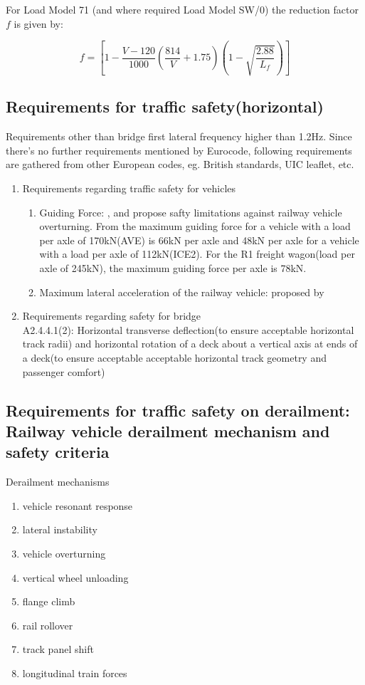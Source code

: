 For Load Model 71 (and where required Load Model SW/0) the reduction factor $f$ is given by:

\begin{equation}
	f=[1-\frac{V-120}{1000}(\frac{814}{V}+1.75)(1-\sqrt{\frac{2.88}{L_f}})]
\end{equation}

\subsection{Requirements for traffic safety(horizontal)}
Requirements other than bridge first lateral frequency higher than 1.2Hz. Since there's no further requirements mentioned by Eurocode, following requirements are gathered from other European codes, eg. British standards, UIC leaflet, etc.

\begin{enumerate}[-]
	\item Requirements regarding traffic safety for vehicles
	\begin{enumerate}
		\item Guiding Force: \cite{code2005518} , \cite{en200714363} and\cite{cuadrado2008analysis} propose safty limitations against railway vehicle overturning. From\cite{en200714363} the maximum guiding force for a vehicle with a load per axle of 170kN(AVE) is 66kN per axle and 48kN per axle for a vehicle with a load per axle of 112kN(ICE2). For the R1 freight wagon(load per axle of 245kN), the maximum guiding force per axle is 78kN.
		\item Maximum lateral acceleration of the railway vehicle: proposed by \cite{13803}
	\end{enumerate}
	\item Requirements regarding safety for bridge\\
	\cite{EC0} A2.4.4.1(2): Horizontal transverse deflection(to ensure acceptable horizontal track radii) and horizontal rotation of a deck about a vertical axis at ends of a deck(to ensure acceptable acceptable horizontal track geometry and passenger comfort)
\end{enumerate}

\subsection{Requirements for traffic safety on derailment: Railway vehicle derailment mechanism and safety criteria}

Derailment mechanisms
\begin{enumerate}
	\item vehicle resonant response
	\item lateral instability
	\item vehicle overturning
	\item vertical wheel unloading
	\item flange climb
	\item rail rollover
	\item track panel shift
	\item longitudinal train forces
\end{enumerate}

